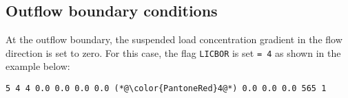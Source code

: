 \subsection{Outflow boundary conditions}
At the outflow boundary, the suspended load concentration gradient in the flow direction is set to zero. For this case, the flag \texttt{LICBOR} is set \texttt{= 4} as shown in the example below:

\begin{lstlisting}[frame=trBL]
5 4 4 0.0 0.0 0.0 0.0 (*@\color{PantoneRed}4@*) 0.0 0.0 0.0 565 1
\end{lstlisting}

%


